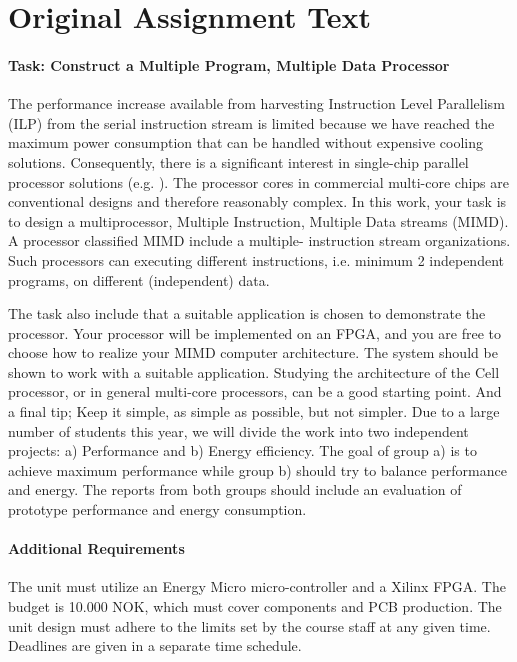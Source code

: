 \section{Original Assignment Text}\label{intro:original-text}

\paragraph{Task: Construct a Multiple Program, Multiple Data Processor}
The performance increase available from harvesting Instruction Level Parallelism
(ILP) from the serial instruction stream is limited because we have reached the
maximum power consumption that can be handled without expensive cooling
solutions\cite{olukotun}. Consequently, there is a significant interest in
single-chip parallel processor solutions (e.g. \cite{bell,kongetira}). The
processor cores in commercial multi-core chips are conventional designs and
therefore reasonably complex. In this work, your task is to design a
multiprocessor, Multiple Instruction, Multiple Data streams (MIMD). A processor
classified MIMD include a multiple- instruction stream
organizations\cite{flynn}. Such processors can executing different instructions,
i.e. minimum 2 independent programs, on different (independent) data.

The task also include that a suitable application is chosen to demonstrate the
processor. Your processor will be implemented on an FPGA, and you are free to
choose how to realize your MIMD computer architecture. The system should be
shown to work with a suitable application. Studying the architecture of the
Cell processor\cite{wiki_cell_mpu}, or in general multi-core
processors\cite{wiki_multicore}, can be a good starting point. And a final tip;
Keep it simple, as simple as possible, but not simpler. Due to a large number of
students this year, we will divide the work into two independent projects: a)
Performance and b) Energy efficiency. The goal of group a) is to achieve maximum
performance while group b) should try to balance performance and energy. The
reports from both groups should include an evaluation of prototype performance
and energy consumption.

\paragraph{Additional Requirements}
The unit must utilize an Energy Micro micro-controller and a Xilinx FPGA. The
budget is 10.000 NOK, which must cover components and PCB production. The unit
design must adhere to the limits set by the course staff at any given time.
Deadlines are given in a separate time schedule.

